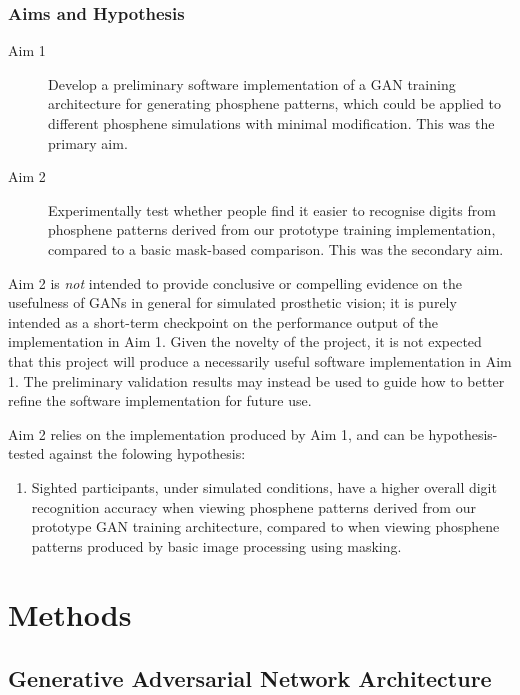 \documentclass[a4paper,11pt,openany]{book}
\begin{document}
\section*{Aims and Hypothesis}
\label{sec:orgb2592c6}

\begin{description}
\item[{Aim 1}] Develop a preliminary software implementation of a GAN training architecture for generating phosphene patterns, which could be applied to different phosphene simulations with minimal modification. This was the primary aim.
\item[{Aim 2}] Experimentally test whether people find it easier to recognise digits from phosphene patterns derived from our prototype training implementation, compared to a basic mask-based comparison. This was the secondary aim.
\end{description}

Aim 2 is \emph{not} intended to provide conclusive or compelling evidence on the usefulness of GANs in general for simulated prosthetic vision; it is purely intended as a short-term checkpoint on the performance output of the implementation in Aim 1.
Given the novelty of the project, it is not expected that this project will produce a necessarily useful software implementation in Aim 1.
The preliminary validation results may instead be used to guide how to better refine the software implementation for future use.

Aim 2 relies on the implementation produced by Aim 1, and can be hypothesis-tested against the folowing hypothesis:

\begin{enumerate}
\item Sighted participants, under simulated conditions, have a higher overall digit recognition accuracy when viewing phosphene patterns derived from our prototype GAN training architecture, compared to when viewing phosphene patterns produced by basic image processing using masking.
\end{enumerate}

\part{Methods}
\label{sec:org3cf1445}
\chapter{Generative Adversarial Network Architecture}
\label{sec:orge602128}
\label{orgb801cd0}
\end{document}
